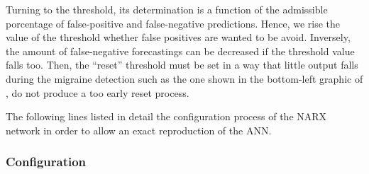 Turning to the threshold, its determination is a function of the admissible porcentage of false-positive and false-negative predictions. 
Hence, we rise the value of the threshold whether false positives are wanted to be avoid. 
Inversely, the amount of false-negative forecastings can be decreased if the threshold value falls too.
Then, the ``reset'' threshold must be set in a way that little output falls during the migraine detection such as the one shown in the bottom-left graphic of , do not produce a too early reset process.

The following lines listed in detail the configuration process of the NARX network
in order to allow an exact reproduction of the ANN.

\subsubsection{Configuration}

